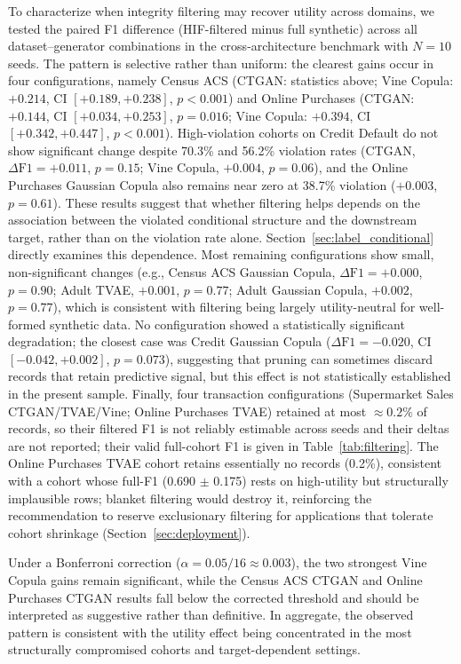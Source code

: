 \documentclass[pdflatex,sn-mathphys-num]{sn-jnl}
\theoremstyle{thmstyleone}%
\theoremstyle{thmstyletwo}%
\theoremstyle{thmstylethree}%
\begin{document}
To characterize when integrity filtering may recover utility across domains, we tested the paired F1 difference (HIF-filtered minus full synthetic) across all dataset--generator combinations in the cross-architecture benchmark with $N=10$ seeds. The pattern is selective rather than uniform: the clearest gains occur in four configurations, namely Census ACS (CTGAN: statistics above; Vine Copula: $+0.214$, CI $[+0.189, +0.238]$, $p < 0.001$) and Online Purchases (CTGAN: $+0.144$, CI $[+0.034, +0.253]$, $p = 0.016$; Vine Copula: $+0.394$, CI $[+0.342, +0.447]$, $p < 0.001$). High-violation cohorts on Credit Default do not show significant change despite 70.3\% and 56.2\% violation rates (CTGAN, $\Delta\text{F1} = +0.011$, $p = 0.15$; Vine Copula, $+0.004$, $p = 0.06$), and the Online Purchases Gaussian Copula also remains near zero at 38.7\% violation ($+0.003$, $p = 0.61$). These results suggest that whether filtering helps depends on the association between the violated conditional structure and the downstream target, rather than on the violation rate alone. Section~\ref{sec:label_conditional} directly examines this dependence. Most remaining configurations show small, non-significant changes (e.g., Census ACS Gaussian Copula, $\Delta\text{F1} = +0.000$, $p = 0.90$; Adult TVAE, $+0.001$, $p = 0.77$; Adult Gaussian Copula, $+0.002$, $p = 0.77$), which is consistent with filtering being largely utility-neutral for well-formed synthetic data. No configuration showed a statistically significant degradation; the closest case was Credit Gaussian Copula ($\Delta\text{F1} = -0.020$, CI $[-0.042, +0.002]$, $p = 0.073$), suggesting that pruning can sometimes discard records that retain predictive signal, but this effect is not statistically established in the present sample. Finally, four transaction configurations (Supermarket Sales CTGAN/TVAE/Vine; Online Purchases TVAE) retained at most $\approx 0.2\%$ of records, so their filtered F1 is not reliably estimable across seeds and their deltas are not reported; their valid full-cohort F1 is given in Table~\ref{tab:filtering}. The Online Purchases TVAE cohort retains essentially no records (0.2\%), consistent with a cohort whose full-F1 (0.690 $\pm$ 0.175) rests on high-utility but structurally implausible rows; blanket filtering would destroy it, reinforcing the recommendation to reserve exclusionary filtering for applications that tolerate cohort shrinkage (Section~\ref{sec:deployment}).

Under a Bonferroni correction ($\alpha = 0.05/16 \approx 0.003$), the two strongest Vine Copula gains remain significant, while the Census ACS CTGAN and Online Purchases CTGAN results fall below the corrected threshold and should be interpreted as suggestive rather than definitive. In aggregate, the observed pattern is consistent with the utility effect being concentrated in the most structurally compromised cohorts and target-dependent settings.
\end{document}
